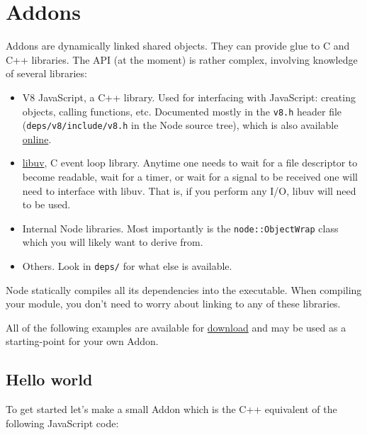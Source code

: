 \section{Addons}\label{addons}

Addons are dynamically linked shared objects. They can provide glue to C
and C++ libraries. The API (at the moment) is rather complex, involving
knowledge of several libraries:

\begin{itemize}
\item
  V8 JavaScript, a C++ library. Used for interfacing with JavaScript:
  creating objects, calling functions, etc. Documented mostly in the
  \texttt{v8.h} header file (\texttt{deps/v8/include/v8.h} in the Node
  source tree), which is also available
  \href{http://izs.me/v8-docs/main.html}{online}.
\item
  \href{https://github.com/joyent/libuv}{libuv}, C event loop library.
  Anytime one needs to wait for a file descriptor to become readable,
  wait for a timer, or wait for a signal to be received one will need to
  interface with libuv. That is, if you perform any I/O, libuv will need
  to be used.
\item
  Internal Node libraries. Most importantly is the
  \texttt{node::ObjectWrap} class which you will likely want to derive
  from.
\item
  Others. Look in \texttt{deps/} for what else is available.
\end{itemize}

Node statically compiles all its dependencies into the executable. When
compiling your module, you don't need to worry about linking to any of
these libraries.

All of the following examples are available for
\href{https://github.com/rvagg/node-addon-examples}{download} and may be
used as a starting-point for your own Addon.

\subsection{Hello world}\label{hello-world}

To get started let's make a small Addon which is the C++ equivalent of
the following JavaScript code:

\begin{Shaded}
\begin{Highlighting}[]
 \NormalTok{= }\NormalTok{() \{ } \NormalTok{; \};}
\end{Highlighting}
\end{Shaded}

